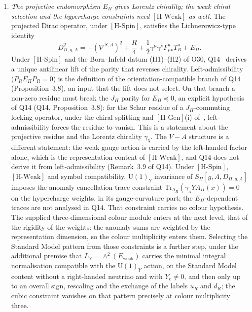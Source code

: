 \documentclass[11pt,a4paper]{article}
\theoremstyle{definition}
\newcommand{\UU}{\mathrm{U}}
\newcommand{\SPI}{S_\Pi}
\newcommand{\Sbundle}{\mathcal{S}_\Pi}
\newcommand{\Epi}{E_\Pi}
\newcommand{\Ew}{E_{\mathrm{weak}}}
\newcommand{\HSpin}{\ensuremath{[\mathrm{H\text{-}Spin}]}}
\newcommand{\HWeak}{\ensuremath{[\mathrm{H\text{-}Weak}]}}
\newcommand{\HGen}{\ensuremath{[\mathrm{H\text{-}Gen}]}}
\begin{document}
\begin{enumerate}
      \item \textit{The projective endomorphism $\Epi$ gives Lorentz chirality; the weak chiral selection and the
      hypercharge constraints need \HWeak{} as well.}
      The projected Dirac operator, under \HSpin{}, satisfies the Lichnerowicz-type identity
      \[
        D^2_{\Pi,g,A}
        = -(\nabla^{S,A})^2 + \frac{R}{4} + \frac{1}{2}\gamma^\mu\gamma^\nu F^a_{\mu\nu} T^a_R
        + \Epi.
      \]
      Under \HSpin{} and the Born--Infeld datum (H1)--(H2) of O30, Q14~\cite{Beau2026q14} derives a unique
      antilinear lift of the parity that reverses chirality.
      Left-admissibility ($P_R \Epi P_R = 0$) is the definition of the orientation-compatible branch of Q14
      (Proposition~3.8), an input that the lift does not select.
      On that branch a non-zero residue must break the $J_\Pi$ parity for $\Epi\preceq0$, an explicit hypothesis of Q14
      (Q14, Proposition~3.8): for the Schur residue of a
      $J_\Pi$-commuting locking operator, under the chiral splitting and \HGen{}(i) of~\cite{Beau2026prs},
      left-admissibility forces the residue to vanish.
      This is a statement about the projective residue and the Lorentz chirality $\gamma_5$.
      The $V-A$ structure is a different statement: the weak gauge action is carried by the left-handed factor
      alone, which is the representation content of \HWeak{}, and Q14 does not derive it from left-admissibility
      (Remark~3.9 of Q14).
      Under \HSpin{}, \HWeak{} and symbol compatibility, $\UU(1)_Y$ invariance of $\SPI[g,A,D_{\Pi,g,A}]$ imposes the
      anomaly-cancellation trace constraint $\mathrm{Tr}_{\Sbundle}(\gamma_5 Y A_\Pi(x)) = 0$ on the hypercharge
      weights, in its gauge-curvature part; the $\Epi$-dependent traces are not analysed in Q14.
      That constraint carries no colour hypothesis.
      The supplied three-dimensional colour module enters at the next level, that of the rigidity of
      the weights: the anomaly sums are weighted by the representation dimension, so the colour
      multiplicity enters them.
      Selecting the Standard Model pattern from those constraints is a further step, under the
      additional premise that $L_Y = \wedge^2(\Ew)$ carries the minimal integral normalisation compatible with the
      $\UU(1)_Y$ action, on the Standard Model content without a right-handed neutrino and with $Y_e \neq 0$, and then
      only up to an overall sign, rescaling and the exchange of the labels $u_R$ and $d_R$; the cubic constraint
      vanishes on that pattern precisely at colour multiplicity three.
    \end{enumerate}
\end{document}
